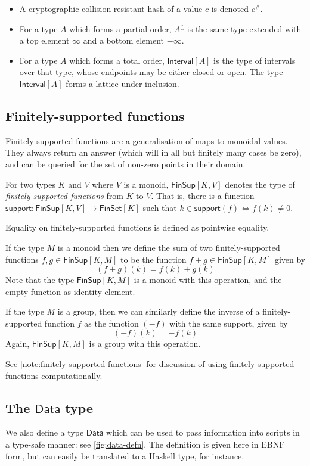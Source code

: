 \documentclass[a4paper]{article}
\newcounter{note}
\newcommand{\s}{\textsf}  %
\newcommand{\msf}[1]{\ensuremath{\mathsf{#1}}}
\newcommand{\hash}[1]{\ensuremath{#1^{\#}}}
\newcommand{\FinSet}[1]{\ensuremath{\s{FinSet}[#1]}}
\newcommand{\Interval}[1]{\ensuremath{\s{Interval}[#1]}}
\newcommand{\extended}[1]{#1^\updownarrow}
\newcommand{\FinSup}[2]{\ensuremath{\s{FinSup}[#1,#2]}}
\newcommand{\support}{\msf{support}}
\newcommand{\Data}{\ensuremath{\s{Data}}}
\begin{document}
\begin{itemize}
\item A cryptographic collision-resistant hash of a value $c$ is denoted $\hash{c}$.

\item For a type $A$ which forms a partial order, $\extended{A}$ is the same
  type extended with a top element $\infty$ and a bottom element $-\infty$.

\item For a type $A$ which forms a total order,  $\Interval{A}$ is the type
  of intervals over that type, whose endpoints may be either closed or open.
  The type $\Interval{A}$ forms a lattice under inclusion.
\end{itemize}

\subsection {Finitely-supported functions}
\label{sec:fsfs}

Finitely-supported functions are a generalisation of maps to monoidal values.
They always return an answer (which will in all but finitely many cases be
zero), and can be queried for the set of non-zero points in their domain.

For two types $K$ and $V$ where $V$ is a monoid, $\FinSup{K}{V}$ denotes the type of
\textit{finitely-supported functions} from $K$ to $V$. That is, there is a
function $\support : \FinSup{K}{V} \rightarrow \FinSet{K}$ such that
$k \in \support(f) \Leftrightarrow f(k) \neq 0$.

Equality on finitely-supported functions is defined as pointwise equality.

If the type $M$ is a monoid then we define the sum of two finitely-supported
functions
$f, g \in \FinSup{K}{M}$ to be the function $f+g \in \FinSup{K}{M}$ given by
\[(f+g)(k) = f(k) + g(k) \]
Note that the type $\FinSup{K}{M}$ is a monoid with this
operation, and the empty function as
identity element.

If the type $M$ is a group, then we can
similarly define the inverse of a finitely-supported function $f$ as
the function $(-f)$ with the same support, given by
\[ (-f)(k) = -f(k) \]
Again, $\FinSup{K}{M}$ is a group with this operation.

See \cref{note:finitely-supported-functions} for discussion of using
finitely-supported functions computationally.

\subsection{The \Data{} type}
We also define a type \Data{} which can be used to pass information
into scripts in a type-safe manner: see \cref{fig:data-defn}. The
definition is given here in EBNF form, but can easily be translated to
a Haskell type, for instance.
\end{document}
